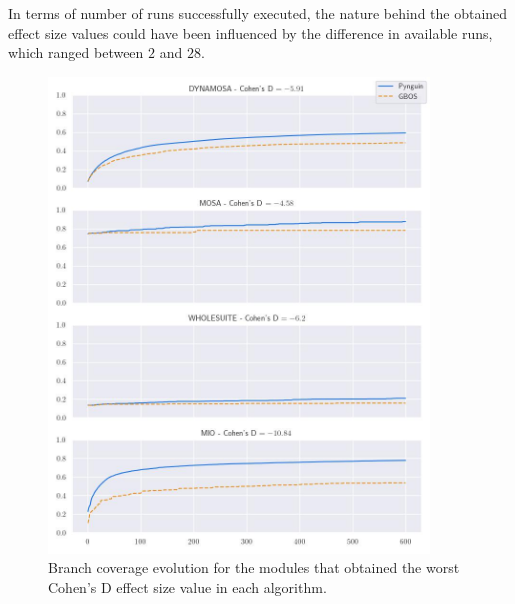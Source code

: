 \documentclass[%
  chapterprefix=false,%
  open=right,%
  twoside=true,%
  paper=a4,%
  logofile={Figures/logo.png},%
  thesistype=master,%
  UKenglish,%
]{se2thesis}
\begin{document}
In terms of number of runs successfully executed, the nature behind the obtained effect size values could have been influenced by the difference in available runs, which ranged between \(2\) and \(28\).
\begin{figure}[pbth]
  \centering
  \includegraphics[width=0.9\textwidth]{Figures/Results/worstES.jpg}
  \caption{Branch coverage evolution for the modules that obtained the worst Cohen's D effect size value in each algorithm.}\label{fig:worst}
\end{figure}
\end{document}
